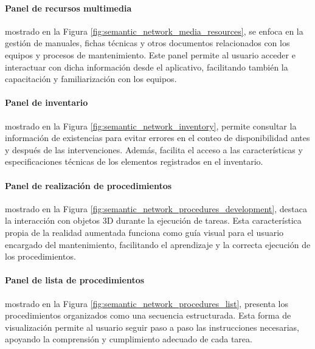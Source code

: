             

            \paragraph{Panel de recursos multimedia} mostrado en la Figura \ref{fig:semantic_network_media_resources}, se enfoca en la gestión de manuales, fichas técnicas y otros documentos relacionados con los equipos y procesos de mantenimiento. Este panel permite al usuario acceder e interactuar con dicha información desde el aplicativo, facilitando también la capacitación y familiarización con los equipos.

            

            \paragraph{Panel de inventario} mostrado en la Figura \ref{fig:semantic_network_inventory}, permite consultar la información de existencias para evitar errores en el conteo de disponibilidad antes y después de las intervenciones. Además, facilita el acceso a las características y especificaciones técnicas de los elementos registrados en el inventario.

            

            \paragraph{Panel de realización de procedimientos} mostrado en la Figura \ref{fig:semantic_network_procedures_development}, destaca la interacción con objetos 3D durante la ejecución de tareas. Esta característica propia de la realidad aumentada funciona como guía visual para el usuario encargado del mantenimiento, facilitando el aprendizaje y la correcta ejecución de los procedimientos.

            

            \paragraph{Panel de lista de procedimientos} mostrado en la Figura \ref{fig:semantic_network_procedures_list}, presenta los procedimientos organizados como una secuencia estructurada. Esta forma de visualización permite al usuario seguir paso a paso las instrucciones necesarias, apoyando la comprensión y cumplimiento adecuado de cada tarea.

